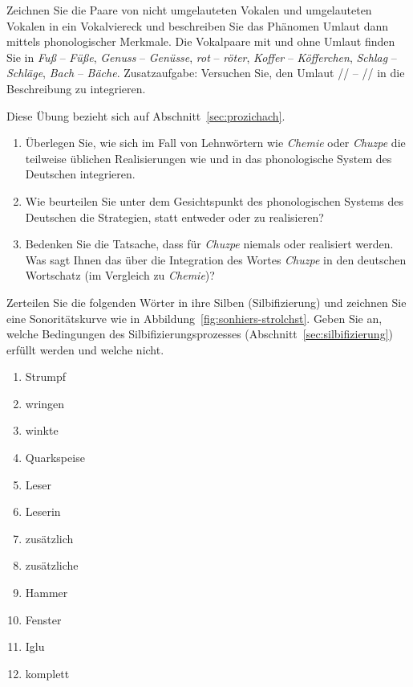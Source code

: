 \Uebung \label{u42} Zeichnen Sie die Paare von nicht umgelauteten Vokalen und umgelauteten Vokalen in ein Vokalviereck und beschreiben Sie das Phänomen Umlaut dann mittels phonologischer Merkmale.
Die Vokalpaare mit und ohne Umlaut finden Sie in \textit{Fuß} -- \textit{Füße}, \textit{Genuss} -- \textit{Genüsse}, \textit{rot} -- \textit{röter}, \textit{Koffer} -- \textit{Köfferchen}, \textit{Schlag} -- \textit{Schläge}, \textit{Bach} -- \textit{Bäche}.
Zusatzaufgabe: Versuchen Sie, den Umlaut // -- // in die Beschreibung zu integrieren.

\Uebung[\tristar] \label{u43} Diese Übung bezieht sich auf Abschnitt~\ref{sec:prozichach}.

\begin{enumerate}\Lf
  \item Überlegen Sie, wie sich im Fall von Lehnwörtern wie \textit{Chemie} oder \textit{Chuzpe} die teilweise üblichen Realisierungen wie \textipa{[\c{c}emi:]} und \textipa{[XU\t{ts}p@]} in das phonologische System des Deutschen integrieren.
  \item Wie beurteilen Sie unter dem Gesichtspunkt des phonologischen Systems des Deutschen die Strategien, statt \textipa{[\c{c}emi:]} entweder \textipa{[Semi:]} oder \textipa{[kemi:]} zu realisieren?
  \item Bedenken Sie die Tatsache, dass für \textit{Chuzpe} niemals \textipa{[SU\t{ts}p@]} oder \textipa{[kU\t{ts}p@]} realisiert werden.
    Was sagt Ihnen das über die Integration des Wortes \textit{Chuzpe} in den deutschen Wortschatz (im Vergleich zu \textit{Chemie})?
\end{enumerate}

\Uebung \label{u44} Zerteilen Sie die folgenden Wörter in ihre Silben (Silbifizierung) und zeichnen Sie eine Sonoritätskurve wie in Abbildung~\ref{fig:sonhiers-strolchst}.
Geben Sie an, welche Bedingungen des Silbifizierungsprozesses (Abschnitt~\ref{sec:silbifizierung}) erfüllt werden und welche nicht.

\begin{enumerate}\Lf
  \item Strumpf
  \item wringen
  \item winkte
  \item Quarkspeise
  \item Leser
  \item Leserin
  \item zusätzlich
  \item zusätzliche
  \item Hammer
  \item Fenster
  \item Iglu
  \item komplett
\end{enumerate}

